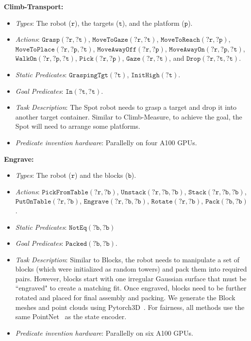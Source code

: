 \textbf{Climb-Transport:}
\begin{itemize}
    \item \textit{Types}: The robot ($\mathtt{r}$), the targets ($\mathtt{t}$), and the platform ($\mathtt{p}$).
    \item \textit{Actions}: $\mathtt{Grasp(?r,?t)}$, $\mathtt{MoveToGaze(?r,?t)}$, $\mathtt{MoveToReach(?r,?p)}$, $\mathtt{MoveToPlace(?r,?p,?t)}$, $\mathtt{MoveAwayOff(?r,?p)}$, $\mathtt{MoveAwayOn(?r,?p,?t)}$, $\mathtt{WalkOn(?r,?p,?t)}$, $\mathtt{Pick(?r,?p)}$, $\mathtt{Gaze(?r,?t)}$, and $\mathtt{Drop(?r,?t,?t)}$.
    \item \textit{Static Predicates}: $\mathtt{GraspingTgt(?t)}$, $\mathtt{InitHigh(?t)}$.
    \item \textit{Goal Predicates}: $\mathtt{In(?t,?t)}$.
    \item \textit{Task Description}: The Spot robot needs to grasp a target and drop it into another target container.
    Similar to Climb-Measure, to achieve the goal, the Spot will need to arrange some platforms.
    \item \textit{Predicate invention hardware}: Parallelly on four A100 GPUs.
\end{itemize}

\textbf{Engrave:}
\begin{itemize}
    \item \textit{Types}: The robot ($\mathtt{r}$) and the blocks ($\mathtt{b}$). 
    \item \textit{Actions}: $\mathtt{PickFromTable(?r,?b)}$, $\mathtt{Unstack(?r,?b,?b)}$, $\mathtt{Stack(?r,?b,?b)}$, $\mathtt{PutOnTable(?r,?b)}$, $\mathtt{Engrave(?r, ?b,?b)}$, $\mathtt{Rotate(?r,?b)}$, $\mathtt{Pack(?b,?b)}$.
    \item \textit{Static Predicates}: $\mathtt{NotEq(?b,?b)}$
    \item \textit{Goal Predicates}: $\mathtt{Packed(?b,?b)}$.
    \item \textit{Task Description}: Similar to Blocks, the robot needs to manipulate a set of blocks (which were initialized as random towers) and pack them into required pairs. 
    However, blocks start with one irregular Gaussian surface that must be ``engraved" to create a matching fit. 
    Once engraved, blocks need to be further rotated and placed for final assembly and packing. 
    We generate the Block meshes and point clouds using Pytorch3D~\cite{ravi2020pytorch3d}. 
    For fairness, all methods use the same PointNet~\cite{qi2017pointnet} as the state encoder. 
    \item \textit{Predicate invention hardware}: Parallelly on six A100 GPUs.
\end{itemize}

